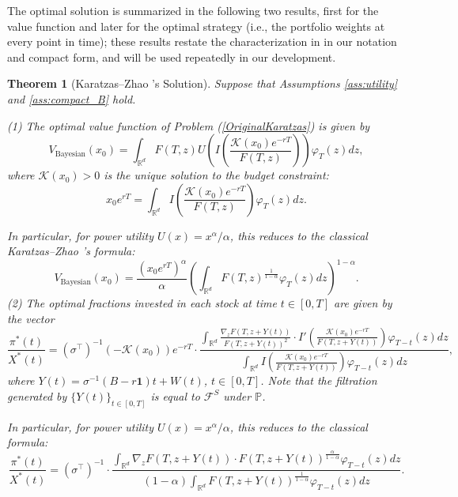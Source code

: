 \documentclass[11pt]{article}
\newtheorem{theorem}{Theorem}
\theoremstyle{definition}
\begin{document}
The optimal solution is summarized in the following two results, first for the value function and later for the optimal strategy (i.e., the portfolio weights at every point in time); these results restate the characterization in \cite{KZ98} in our notation and compact form, and will be used repeatedly in our development.
\begin{theorem}[Karatzas--Zhao \cite{KZ98}'s Solution]
\label{thm:karatzas_zhao_general_compact}
Suppose that Assumptions \ref{ass:utility} and \ref{ass:compact_B} hold. 

(1) The optimal value function of Problem (\ref{OriginalKaratzas}) is given by
$$
V_{\text{Bayesian}}(x_0) = \int_{\mathbb{R}^d} F(T, z) U\left( I\left( \frac{\mathcal{K}(x_0) e^{-rT}}{F(T,z)} \right) \right) \varphi_T(z) dz,
$$
where $\mathcal{K}(x_0) > 0$ is the unique solution to the budget constraint:
\begin{equation}\label{eq:budget}
x_0 e^{rT} = \int_{\mathbb{R}^d} I\left( \frac{\mathcal{K}(x_0) e^{-rT}}{F(T,z)} \right) \varphi_T(z) dz.
\end{equation}


In particular, for power utility $U(x) = x^\alpha / \alpha$, this reduces to the classical Karatzas--Zhao \cite{KZ98}'s formula:
$$
V_{\text{Bayesian}}(x_0) = \frac{(x_0 e^{rT})^\alpha}{\alpha} \left( \int_{\mathbb{R}^d} F(T,z)^{\frac{1}{1-\alpha}} \varphi_T(z) dz \right)^{1-\alpha}.
$$
(2) The optimal fractions invested in each stock at time $t \in [0,T]$ are given by the vector
$$
\frac{\pi^*(t)}{X^*(t)} = {\left(\sigma^\top\right)}^{-1} (-\mathcal{K}(x_0)) e^{-rT}\cdot \frac{
\int_{\mathbb{R}^d} \frac{\nabla_z F\left(T,z+Y(t)\right)}{F\left(T,z+Y(t)\right)^2} \cdot I'\left( \frac{\mathcal{K}(x_0) e^{-rT}}{F(T,z+Y(t))} \right) \varphi_{T-t}(z) dz
}{
\int_{\mathbb{R}^d} I\left( \frac{\mathcal{K}(x_0) e^{-rT}}{F(T,z+Y(t))} \right) \varphi_{T-t}(z) dz
},
$$
where $Y(t) = \sigma^{-1} (B - r\mathbf{1}) t + W(t)$, $t \in [0, T]$. Note that the filtration generated by $\{Y(t)\}_{t \in [0,T]}$ is equal to $\mathcal{F}^S$ under $\mathbb{P}$.

In particular, for power utility $U(x) = x^\alpha / \alpha$, this reduces to the classical formula:
$$
\frac{\pi^*(t)}{X^*(t)} = {\left(\sigma^\top\right)}^{-1} \cdot \frac{
\int_{\mathbb{R}^d} \nabla_z F\left(T,z+Y(t)\right) \cdot F\left(T,z+Y(t)\right)^{\frac{\alpha}{1-\alpha}} \varphi_{T-t}(z) dz
}{
(1-\alpha) \int_{\mathbb{R}^d} F\left(T,z+Y(t)\right)^{\frac{1}{1-\alpha}} \varphi_{T-t}(z) dz
}.
$$
\end{theorem}
\end{document}
